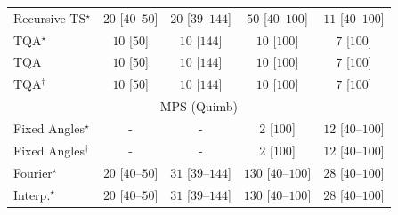 \begin{tabular}{l|cccc|}
Recursive TS$^\star$ & {\cellcolor[HTML]{F4FBF2}} \color[HTML]{000000} $20$ [$40$--$50$] & {\cellcolor[HTML]{F4FBF2}} \color[HTML]{000000} $20$ [$39$--$144$] & {\cellcolor[HTML]{EFF9EB}} \color[HTML]{000000} $50$ [$40$--$100$] & {\cellcolor[HTML]{F6FCF4}} \color[HTML]{000000} $11$ [$40$--$100$] \\
TQA$^\star$ & {\cellcolor[HTML]{F6FCF4}} \color[HTML]{000000} $10$ [$50$] & {\cellcolor[HTML]{F6FCF4}} \color[HTML]{000000} $10$ [$144$] & {\cellcolor[HTML]{F6FCF4}} \color[HTML]{000000} $10$ [$100$] & {\cellcolor[HTML]{F6FCF4}} \color[HTML]{000000} $7$ [$100$] \\
TQA & {\cellcolor[HTML]{F6FCF4}} \color[HTML]{000000} $10$ [$50$] & {\cellcolor[HTML]{F6FCF4}} \color[HTML]{000000} $10$ [$144$] & {\cellcolor[HTML]{F6FCF4}} \color[HTML]{000000} $10$ [$100$] & {\cellcolor[HTML]{F6FCF4}} \color[HTML]{000000} $7$ [$100$] \\
TQA$^\dagger$ & {\cellcolor[HTML]{F6FCF4}} \color[HTML]{000000} $10$ [$50$] & {\cellcolor[HTML]{F6FCF4}} \color[HTML]{000000} $10$ [$144$] & {\cellcolor[HTML]{F6FCF4}} \color[HTML]{000000} $10$ [$100$] & {\cellcolor[HTML]{F6FCF4}} \color[HTML]{000000} $7$ [$100$] \\
\cline{1-5}
\multicolumn{5}{c}{\rule{0pt}{8pt}MPS (Quimb)} \\
\midrule
Fixed Angles$^\star$ & {\cellcolor[HTML]{000000}} \color[HTML]{F1F1F1} {\cellcolor{white}} \color{black} - & {\cellcolor[HTML]{000000}} \color[HTML]{F1F1F1} {\cellcolor{white}} \color{black} - & {\cellcolor[HTML]{F7FCF5}} \color[HTML]{000000} $2$ [$100$] & {\cellcolor[HTML]{F5FBF3}} \color[HTML]{000000} $12$ [$40$--$100$] \\
Fixed Angles$^\dagger$ & {\cellcolor[HTML]{000000}} \color[HTML]{F1F1F1} {\cellcolor{white}} \color{black} - & {\cellcolor[HTML]{000000}} \color[HTML]{F1F1F1} {\cellcolor{white}} \color{black} - & {\cellcolor[HTML]{F7FCF5}} \color[HTML]{000000} $2$ [$100$] & {\cellcolor[HTML]{F5FBF3}} \color[HTML]{000000} $12$ [$40$--$100$] \\
Fourier$^\star$ & {\cellcolor[HTML]{F4FBF2}} \color[HTML]{000000} $20$ [$40$--$50$] & {\cellcolor[HTML]{F2FAEF}} \color[HTML]{000000} $31$ [$39$--$144$] & {\cellcolor[HTML]{DCF2D7}} \color[HTML]{000000} $130$ [$40$--$100$] & {\cellcolor[HTML]{F2FAF0}} \color[HTML]{000000} $28$ [$40$--$100$] \\
Interp.$^\star$ & {\cellcolor[HTML]{F4FBF2}} \color[HTML]{000000} $20$ [$40$--$50$] & {\cellcolor[HTML]{F2FAEF}} \color[HTML]{000000} $31$ [$39$--$144$] & {\cellcolor[HTML]{DCF2D7}} \color[HTML]{000000} $130$ [$40$--$100$] & {\cellcolor[HTML]{F2FAF0}} \color[HTML]{000000} $28$ [$40$--$100$] \\

\end{tabular}
